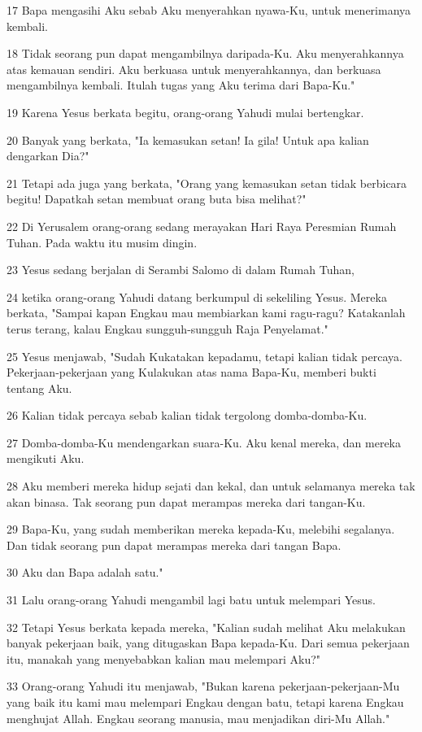 \par 17 Bapa mengasihi Aku sebab Aku menyerahkan nyawa-Ku, untuk menerimanya kembali.
\par 18 Tidak seorang pun dapat mengambilnya daripada-Ku. Aku menyerahkannya atas kemauan sendiri. Aku berkuasa untuk menyerahkannya, dan berkuasa mengambilnya kembali. Itulah tugas yang Aku terima dari Bapa-Ku."
\par 19 Karena Yesus berkata begitu, orang-orang Yahudi mulai bertengkar.
\par 20 Banyak yang berkata, "Ia kemasukan setan! Ia gila! Untuk apa kalian dengarkan Dia?"
\par 21 Tetapi ada juga yang berkata, "Orang yang kemasukan setan tidak berbicara begitu! Dapatkah setan membuat orang buta bisa melihat?"
\par 22 Di Yerusalem orang-orang sedang merayakan Hari Raya Peresmian Rumah Tuhan. Pada waktu itu musim dingin.
\par 23 Yesus sedang berjalan di Serambi Salomo di dalam Rumah Tuhan,
\par 24 ketika orang-orang Yahudi datang berkumpul di sekeliling Yesus. Mereka berkata, "Sampai kapan Engkau mau membiarkan kami ragu-ragu? Katakanlah terus terang, kalau Engkau sungguh-sungguh Raja Penyelamat."
\par 25 Yesus menjawab, "Sudah Kukatakan kepadamu, tetapi kalian tidak percaya. Pekerjaan-pekerjaan yang Kulakukan atas nama Bapa-Ku, memberi bukti tentang Aku.
\par 26 Kalian tidak percaya sebab kalian tidak tergolong domba-domba-Ku.
\par 27 Domba-domba-Ku mendengarkan suara-Ku. Aku kenal mereka, dan mereka mengikuti Aku.
\par 28 Aku memberi mereka hidup sejati dan kekal, dan untuk selamanya mereka tak akan binasa. Tak seorang pun dapat merampas mereka dari tangan-Ku.
\par 29 Bapa-Ku, yang sudah memberikan mereka kepada-Ku, melebihi segalanya. Dan tidak seorang pun dapat merampas mereka dari tangan Bapa.
\par 30 Aku dan Bapa adalah satu."
\par 31 Lalu orang-orang Yahudi mengambil lagi batu untuk melempari Yesus.
\par 32 Tetapi Yesus berkata kepada mereka, "Kalian sudah melihat Aku melakukan banyak pekerjaan baik, yang ditugaskan Bapa kepada-Ku. Dari semua pekerjaan itu, manakah yang menyebabkan kalian mau melempari Aku?"
\par 33 Orang-orang Yahudi itu menjawab, "Bukan karena pekerjaan-pekerjaan-Mu yang baik itu kami mau melempari Engkau dengan batu, tetapi karena Engkau menghujat Allah. Engkau seorang manusia, mau menjadikan diri-Mu Allah."
